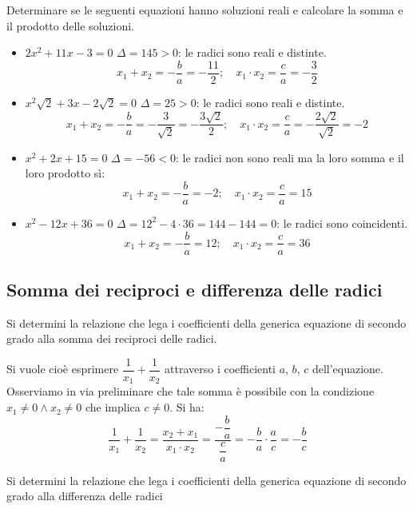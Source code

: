 \begin{esempio}{}{}
Determinare se le seguenti equazioni hanno soluzioni reali e calcolare la 
somma e il prodotto delle soluzioni.
 \begin{itemize}
 \item \(2 x^2 +11 x -3 = 0\) \qquad 
\(\Delta = 145 > 0\): le radici sono reali e distinte.
\[x_1 +x_2 = -\dfrac{b}{a} = -\dfrac{11}{2};\quad 
x_1 \cdot x_2 = \dfrac{c}{a} = -\dfrac{3}{2}\]

 \item \(x^2 \sqrt{2} +3 x -2 \sqrt{2} = 0\) \qquad 
\(\Delta = 25 > 0\): le radici sono reali e distinte.
\[x_1 +x_2 = -\dfrac{b}{a} = -\dfrac{3}{\sqrt{2}} = -\dfrac{3 \sqrt{2}}{2};
\quad 
x_1 \cdot x_2 = \dfrac{c}{a} = -\dfrac{2 \sqrt{2}}{\sqrt{2}} = -2\]

 \item \(x^2 +2 x +15 = 0\) \qquad 
\(\Delta = -56 < 0\): le radici non sono reali ma la loro somma e il loro 
prodotto sì: 
\[x_1 +x_2 = -\dfrac{b}{a} = -2; \quad x_1 \cdot x_2 = \dfrac{c}{a} = 15\]

 \item \(x^2 -12 x +36 = 0\) \qquad 
\(\Delta = 12^{2} -4 \cdot 36 = 144 -144 = 0\): le radici sono coincidenti.
\[x_1 +x_2 = -\dfrac{b}{a} = 12; \quad x_1 \cdot x_2 = \dfrac{c}{a} = 36\]
 \end{itemize}
\end{esempio}

\subsection{Somma dei reciproci e differenza delle radici}

Si determini la relazione che lega i coefficienti della generica 
equazione di secondo grado alla somma dei reciproci delle radici.

Si vuole cioè esprimere \(\dfrac{1}{x_1} +\dfrac{1}{x_2}\) attraverso i 
coefficienti \(a\), \(b\), \(c\) dell'equazione. Osserviamo in via 
preliminare che tale somma è possibile con la condizione 
\(x_1 \neq 0 \wedge x_2 \neq 0\) 
che implica \(c \neq 0\). Si ha: 
\[\dfrac{1}{x_1} +\dfrac{1}{x_2} = 
\dfrac{x_2 +x_1}{x_{1} \cdot x_2} = 
\dfrac{-\dfrac{b}{a}}{\dfrac{c}{a}} = 
-\dfrac{b}{a} \cdot \dfrac{a}{c} = 
-\dfrac{b}{c}\]

Si determini la relazione che lega i coefficienti della generica 
equazione di secondo grado alla differenza delle radici

